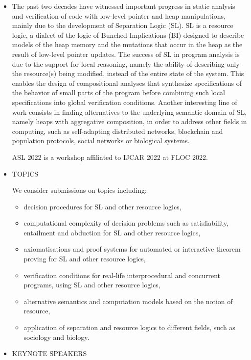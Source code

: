 \documentclass[prodmode,acmtecs]{acmsmall} %
\begin{document}
\begin{itemize}\item  The past two decades have witnessed important progress in static analysis and verification of code with low-level pointer and heap manipulations, mainly due to the development of Separation Logic (SL). SL is a resource logic, a dialect of the logic of Bunched Implications (BI) designed to describe models of the heap memory and the mutations that occur in the heap as the result of low-level pointer updates. The success of SL in program analysis is due to the support for local reasoning, namely the ability of describing only the resource(s) being modified, instead of the entire state of the system. This enables the design of compositional analyses that synthesize specifications of the behavior of small parts of the program before combining such local specifications into global verification conditions. Another interesting line of work consists in finding alternatives to the underlying semantic domain of SL, namely heaps with aggregative composition, in order to address other fields in computing, such as self-adapting distributed networks, blockchain and population protocols, social networks or biological systems. 
 
  ASL 2022 is a workshop affiliated to IJCAR 2022 at FLOC 2022. 
 
\item  TOPICS 
 
  We consider submissions on topics including:  
 
\begin{itemize}\item  decision procedures for SL and other resource logics, 
\item  computational complexity of decision problems such as satisfiability, entailment and abduction for SL and other resource logics, 
\item  axiomatisations and proof systems for automated or interactive theorem proving for SL and other resource logics, 
\item  verification conditions for real-life interprocedural and concurrent programs, using SL and other resource logics, 
\item  alternative semantics and computation models based on the notion of resource, 
\item  application of separation and resource logics to different fields, such as sociology and biology.
\end{itemize} 
\item  KEYNOTE SPEAKERS 
 

\end{itemize}
\end{document}

